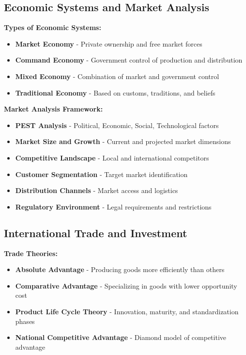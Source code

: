 \documentclass[12pt]{article}
\begin{document}
\subsection{Economic Systems and Market Analysis}

\textbf{Types of Economic Systems:}
\begin{itemize}
    \item \textbf{Market Economy} - Private ownership and free market forces
    \item \textbf{Command Economy} - Government control of production and distribution
    \item \textbf{Mixed Economy} - Combination of market and government control
    \item \textbf{Traditional Economy} - Based on customs, traditions, and beliefs
\end{itemize}

\textbf{Market Analysis Framework:}
\begin{itemize}
    \item \textbf{PEST Analysis} - Political, Economic, Social, Technological factors
    \item \textbf{Market Size and Growth} - Current and projected market dimensions
    \item \textbf{Competitive Landscape} - Local and international competitors
    \item \textbf{Customer Segmentation} - Target market identification
    \item \textbf{Distribution Channels} - Market access and logistics
    \item \textbf{Regulatory Environment} - Legal requirements and restrictions
\end{itemize}

\subsection{International Trade and Investment}

\textbf{Trade Theories:}
\begin{itemize}
    \item \textbf{Absolute Advantage} - Producing goods more efficiently than others
    \item \textbf{Comparative Advantage} - Specializing in goods with lower opportunity cost
    \item \textbf{Product Life Cycle Theory} - Innovation, maturity, and standardization phases
    \item \textbf{National Competitive Advantage} - Diamond model of competitive advantage
\end{itemize}
\end{document}
